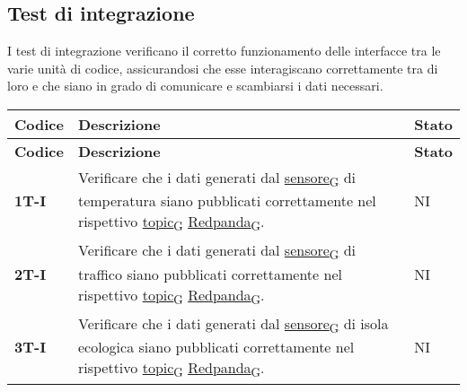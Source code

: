 \subsection{Test di integrazione}
I test di integrazione verificano il corretto funzionamento delle interfacce tra le varie unità di codice,
assicurandosi che esse interagiscano correttamente tra di loro e che siano in grado di comunicare e scambiarsi i dati necessari. \\
\begin{longtable}{|>{\raggedright\arraybackslash}m{}|>{\raggedright\arraybackslash}m{}|>{\raggedright\arraybackslash}m{}|}
	\hline
	\textbf{Codice} & \textbf{Descrizione}                                                                                                                 & \textbf{Stato} \\
	\hline
	\endfirsthead
	\hline
	\textbf{Codice} & \textbf{Descrizione}                                                                                                                 & \textbf{Stato} \\
	\endhead
	\textbf{1T-I}   & Verificare che i dati generati dal \href{https://7last.github.io/docs/rtb/documentazione-interna/glossario\#sensore}{sensore\textsubscript{G}} di temperatura siano pubblicati correttamente nel rispettivo \href{https://7last.github.io/docs/rtb/documentazione-interna/glossario\#topic}{topic\textsubscript{G}} \href{https://7last.github.io/docs/rtb/documentazione-interna/glossario\#redpanda}{Redpanda\textsubscript{G}}.              & NI             \\
	\hline
	\textbf{2T-I}   & Verificare che i dati generati dal \href{https://7last.github.io/docs/rtb/documentazione-interna/glossario\#sensore}{sensore\textsubscript{G}} di traffico siano pubblicati correttamente nel rispettivo \href{https://7last.github.io/docs/rtb/documentazione-interna/glossario\#topic}{topic\textsubscript{G}} \href{https://7last.github.io/docs/rtb/documentazione-interna/glossario\#redpanda}{Redpanda\textsubscript{G}}.                 & NI             \\
	\hline
	\textbf{3T-I}   & Verificare che i dati generati dal \href{https://7last.github.io/docs/rtb/documentazione-interna/glossario\#sensore}{sensore\textsubscript{G}} di isola ecologica siano pubblicati correttamente nel rispettivo \href{https://7last.github.io/docs/rtb/documentazione-interna/glossario\#topic}{topic\textsubscript{G}} \href{https://7last.github.io/docs/rtb/documentazione-interna/glossario\#redpanda}{Redpanda\textsubscript{G}}.          & NI             \\

\end{longtable}
